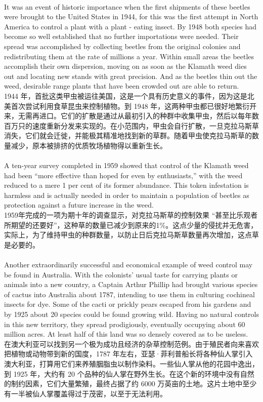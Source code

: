 \documentclass{article}
\begin{document}
\\
It was an event of historic importance when the first shipments of these beetles were brought to the United States in 1944, for this was the first attempt in North America to control a plant with a plant - eating insect. By 1948 both species had become so well established that no further importations were needed. Their spread was accomplished by collecting beetles from the original colonies and redistributing them at the rate of millions a year. Within small areas the beetles accomplish their own dispersion, moving on as soon as the Klamath weed dies out and locating new stands with great precision. And as the beetles thin out the weed, desirable range plants that have been crowded out are able to return.\\
1944 年，首批这类甲虫被运往美国，这是一个具有历史意义的事件，因为这是北美首次尝试利用食草昆虫来控制植物。到 1948 年，这两种甲虫都已很好地繁衍开来，无需再进口。它们的扩散是通过从最初引入的种群中收集甲虫，然后以每年数百万只的速度重新分发来实现的。在小范围内，甲虫会自行扩散，一旦克拉马斯草消失，它们就会迁徙，并能极其精准地找到新的草群。随着甲虫使克拉马斯草的数量减少，原本被排挤的优质牧场植物得以重新生长。 \\

\\
A ten-year survey completed in 1959 showed that control of the Klamath weed had been “more effective than hoped for even by enthusiasts,” with the weed reduced to a mere 1 per cent of its former abundance. This token infestation is harmless and is actually needed in order to maintain a population of beetles as protection against a future increase in the weed.\\
1959年完成的一项为期十年的调查显示，对克拉马斯草的控制效果 “甚至比乐观者所期望的还要好”，这种草的数量已减少到原来的1\%。这点少量的侵扰并无危害，实际上，为了维持甲虫的种群数量，以防止日后克拉马斯草数量再次增加，这点草是必要的。 \\

\\
Another extraordinarily successful and economical example of weed control may be found in Australia. With the colonists’ usual taste for carrying plants or animals into a new country, a Captain Arthur Phillip had brought various species of cactus into Australia about 1787, intending to use them in culturing cochineal insects for dye. Some of the cacti or prickly pears escaped from his gardens and by 1925 about 20 species could be found growing wild. Having no natural controls in this new territory, they spread prodigiously, eventually occupying about 60 million acres. At least half of this land was so densely covered as to be useless.\\
在澳大利亚可以找到另一个极为成功且经济的杂草控制范例。由于殖民者向来喜欢把植物或动物带到新的国度，1787 年左右，亚瑟·菲利普船长将各种仙人掌引入澳大利亚，打算用它们来养殖胭脂虫以制作染料。一些仙人掌从他的花园中逸出，到 1925 年，大约有 20 个品种的仙人掌在野外生长。在这个新的环境中没有自然的制约因素，它们大量繁殖，最终占据了约 6000 万英亩的土地。这片土地中至少有一半被仙人掌覆盖得过于茂密，以至于无法利用。 \\
\end{document}

